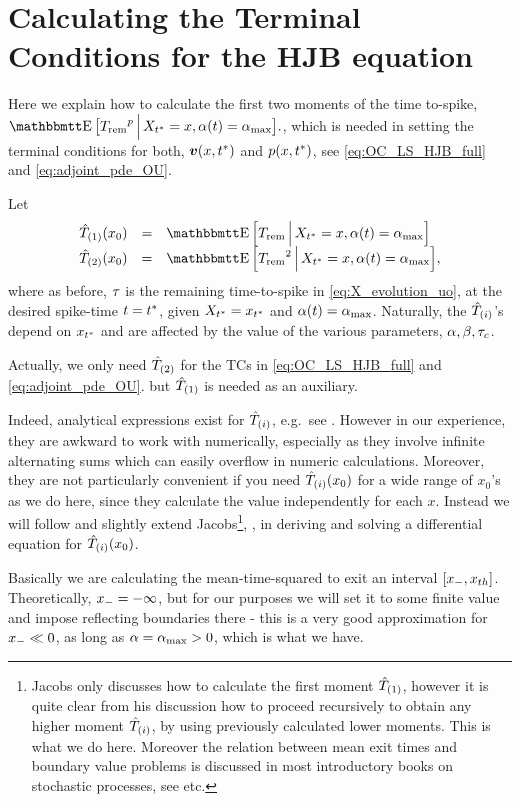 \documentclass{article}
\begin{document}
\appendix
\section{Calculating the Terminal Conditions for the HJB equation}
\label{sec:valuefun_TCs}
Here we explain how to calculate the first two moments of the time to-spike,
$\Exp \big[\trem^p \,\Big|\, X_\T = x, \a(t) = \amax \big].$, which is needed in setting the terminal conditions for both,
${ \boldsymbol{v} }(x,{ t^* })$ and $p(x,{ t^* })$, see \cref{eq:OC_LS_HJB_full} and \cref{eq:adjoint_pde_OU}. 

Let 
\begin{equation} 
\begin{array}{lcl}
\Tone(x_0) &=& \Exp \Big[\trem \,\Big|\, X_\T = x, \a(t) = \amax
\Big]
\\
\Ttwo(x_0) &=&
\Exp \Big[\trem^2 \,\Big|\, X_\T = x, \a(t) = \amax \Big],
\end{array}
\end{equation}
where as before, ${\tau}$ is the remaining time-to-spike in
\cref{eq:X_evolution_uo}, at the desired spike-time $t={ t^* }$, given $X_{ t^* } = x_{ t^* }$
and ${\alpha}(t) = { {\alpha}_{\textrm{max}} }$.
Naturally, the ${ \hat{T}_{(i)} }$'s depend on $x_{ t^* }$ and are affected by the value of the
various parameters, ${\alpha},{\beta},{ \tau_{c} }$.

Actually, we only  need ${ \hat{T}_{(2)} }$ for the TCs in \cref{eq:OC_LS_HJB_full} and \cref{eq:adjoint_pde_OU}. 
but ${ \hat{T}_{(1)} }$ is needed as an auxiliary.

Indeed, analytical expressions exist for ${ \hat{T}_{(i)} }$, e.g.\ see \cite{Inoue1995}.
However in our experience, they are awkward to work with numerically, especially
as they involve infinite alternating sums which can easily overflow in numeric
calculations. Moreover, they are not particularly convenient if you need ${ \hat{T}_{(i)} }
(x_0)$ for a wide range of $x_0$'s as we do here, since they calculate the value
independently for each $x$. Instead we will follow and slightly extend Jacobs\footnote{Jacobs only discusses how to calculate the first moment
${ \hat{T}_{(1)} }$, however it is quite clear from his discussion how to proceed
recursively to obtain any higher moment ${ \hat{T}_{(i)} }$, by using previously calculated
lower moments. This is what we do here. Moreover the relation between mean exit
times and boundary value problems is discussed in most
introductory books on stochastic processes, see \cite{Oksendal2007,Evansa} etc.},
\cite{Jacobs}, in deriving and solving a differential equation for
${ \hat{T}_{(i)} }(x_0)$.

Basically we are calculating the mean-time-squared to exit an interval $[{ x_{-} },
{ x_{th} }]$. Theoretically, ${ x_{-} } = -\infty$, but for our purposes we will set it to
some finite value and impose reflecting boundaries there - this is a very good
approximation for ${ x_{-} } \ll 0$, as long as ${\alpha} = { {\alpha}_{\textrm{max}} } >0$, which is what we
have.
\end{document}
